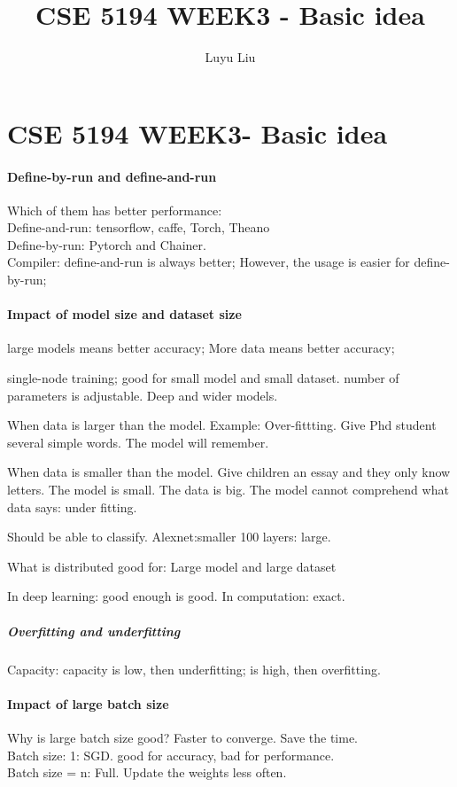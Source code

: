 \documentclass[12pt]{article}
\begin{document}
\author{Luyu Liu}

\newcommand\para{\par\refstepcounter{para}\thepara\space}

\section*{CSE 5194 WEEK3- Basic idea}
    \title{CSE 5194 WEEK3 - Basic idea}
   
    \paragraph{Define-by-run and define-and-run}
    Which of them has better performance:
    \\Define-and-run: tensorflow, caffe, Torch, Theano
    \\Define-by-run: Pytorch and Chainer.
    \\Compiler: define-and-run is always better; However, the usage is easier for define-by-run;

    \paragraph{Impact of model size and dataset size}
    large models means better accuracy; More data means better accuracy;

    single-node training; good for small model and small dataset.
    number of parameters is adjustable. Deep and wider models.

    When data is larger than the model. Example: Over-fittting. Give Phd student several simple words. The model will remember.
    
    When data is smaller than the model. Give children an essay and they only know letters. The model is small. The data is big.
    The model cannot comprehend what data says: under fitting.

    Should be able to classify.
    Alexnet:smaller
    100 layers: large.

    What is distributed good for:  Large model and large dataset

    In deep learning: good enough is good. In computation: exact.

    \subparagraph{Overfitting and underfitting}
    Capacity: capacity is low, then underfitting; is high, then overfitting.

    \paragraph{Impact of large batch size}
    Why is large batch size good? Faster to converge. Save the time.
    \\ Batch size: 1: SGD. good for accuracy, bad for performance.
    \\ Batch size = n: Full. Update the weights less often.
\end{document}

